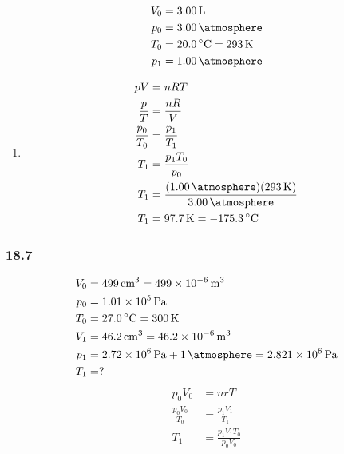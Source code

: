 \documentclass{article}
\begin{document}
\begin{align*}
	V_0 & = \SI{3.00}{\liter} \\
	p_0 & = \SI{3.00}{\atmosphere} \\
	T_0 & = \SI{20.0}{\celsius} = \SI{293}{\kelvin} \\
	p_1 & = \SI{1.00}{\atmosphere}
\end{align*}
\begin{enumerate}[label = \boldalph]
	\item
		\begin{align*}
			pV & = nRT \\
			\frac{ p }{ T } & = \frac{ nR }{ V } \\
			\frac{ p_0 }{ T_0 } & = \frac{ p_1 }{ T_1 } \\
			T_1 & = \frac{ p_1T_0 }{ p_0 } \\
			T_1 & = \frac{ (\SI{1.00}{\atmosphere})(\SI{293}{\kelvin}) }{ \SI{3.00}{\atmosphere} } \\
			T_1 & = \SI{97.7}{\kelvin} = \SI{-175.3}{\celsius}
		\end{align*}
\end{enumerate}

\subsubsection{18.7}

\begin{align*}
	V_0 & = \SI{499}{\centi \meter \cubed} = \SI{499e-6}{\meter \cubed} \\
	p_0 & = \SI{1.01e5}{\pascal} \\
	T_0 & = \SI{27.0}{\celsius} = \SI{300}{\kelvin} \\
	V_1 & = \SI{46.2}{\centi \meter \cubed} = \SI{46.2e-6}{\meter \cubed} \\
	p_1 & = \SI{2.72e6}{\pascal} + \SI{1}{\atmosphere} = \SI{2.821e6}{\pascal} \\
	T_1 & = ?
\end{align*}
\begin{align*}
	p_0V_0 & = nrT \\
	\frac{ p_0V_0 }{ T_0 } & = \frac{ p_1V_1 }{ T_1 } \\
	T_1 & = \frac{ p_1V_1T_0 }{ p_0V_0 }
\end{align*}
\end{document}
